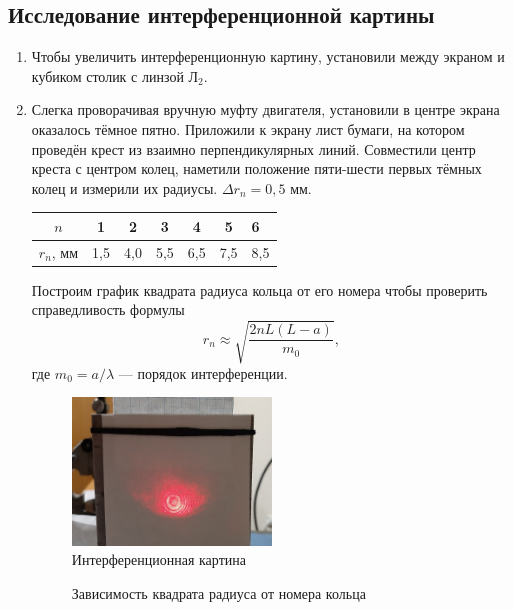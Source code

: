 \documentclass[a4paper,12pt]{article}
\begin{document}
 	\subsection*{Исследование интерференционной картины}
 	\begin{enumerate}
 		\item Чтобы увеличить интерференционную картину, установили между экраном и кубиком столик с линзой Л$_2$.
 		\item Слегка проворачивая вручную муфту двигателя, установили в центре экрана оказалось тёмное пятно. Приложили к экрану лист бумаги, на котором проведён крест из взаимно перпендикулярных линий. Совместили центр креста с центром колец, наметили положение пяти-шести первых тёмных колец и измерили их радиусы. $\Delta r_n = 0{,}5$ мм.
 		\begin{center}
 			\begin{tabular}{|c|c|c|c|c|c|l|}
 				\hline
 				$n$ & 1 & 2 & 3 & 4 & 5 & 6 \\ \hline
 				$r_n$, мм & 1,5 & 4,0 & 5,5 & 6,5 & 7,5 & 8,5 \\ \hline
 			\end{tabular}
 		\end{center}
 		
 		Построим график квадрата радиуса кольца от его номера чтобы проверить справедливость формулы 
 		\begin{equation*}
 		r_n\approx \sqrt{\dfrac{2nL(L-a)}{m_0}},
 		\end{equation*}
 		где $m_0=a/\lambda$ --- порядок интерференции. 
 		\begin{figure}[h]
 			\begin{center}
 				\includegraphics[width = 0.5\textwidth]{4.jpg}
 				\caption{Интерференционная картина}
 			\end{center}
 		\end{figure}
 		
 		\begin{figure}[!htb] \centering
 			\caption{Зависимость квадрата радиуса от номера кольца}
 		\end{figure}
 	\end{enumerate}
\end{document}
